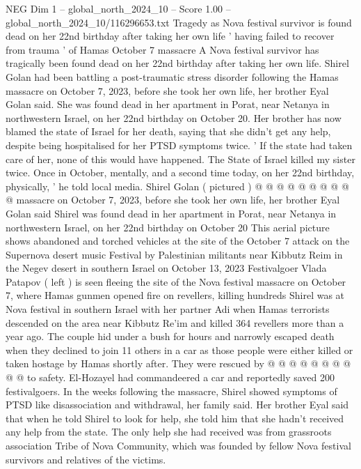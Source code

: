 \begin{textsample}{NEG Dim 1 – global\_north\_2024\_10 – Score 1.00 – global\_north\_2024\_10/116296653.txt}  \label{ex:f1_neg_370}
Tragedy as Nova festival survivor is found dead on her 22nd birthday after taking her own life ' having failed to recover from trauma ' of Hamas October 7 massacre A Nova festival survivor has tragically been found dead on her 22nd birthday after taking her own life.
Shirel Golan had been battling a post-traumatic stress disorder following the Hamas massacre on October 7, 2023, before she took her own life, her brother Eyal Golan said.
She was found dead in her apartment in Porat, near Netanya in northwestern Israel, on her 22nd birthday on October 20.
Her brother has now blamed the state of Israel for her death, saying that she didn't get any help, despite being hospitalised for her PTSD symptoms twice. ' If the state had taken care of her, none of this would have happened.
The State of Israel killed my sister twice.
Once in October, mentally, and a second time today, on her 22nd birthday, physically, ' he told local media.
Shirel Golan ( pictured ) @ @ @ @ @ @ @ @ @ @ massacre on October 7, 2023, before she took her own life, her brother Eyal Golan said Shirel was found dead in her apartment in Porat, near Netanya in northwestern Israel, on her 22nd birthday on October 20 This aerial picture shows abandoned and torched vehicles at the site of the October 7 attack on the Supernova desert music Festival by Palestinian militants near Kibbutz Reim in the Negev desert in southern Israel on October 13, 2023 Festivalgoer Vlada Patapov ( left ) is seen fleeing the site of the Nova festival massacre on October 7, where Hamas gunmen opened fire on revellers, killing hundreds Shirel was at Nova festival in southern Israel with her partner Adi when Hamas terrorists descended on the area near Kibbutz Re'im and killed 364 revellers more than a year ago.
The couple hid under a bush for hours and narrowly escaped death when they declined to join 11 others in a car as those people were either killed or taken hostage by Hamas shortly after.
They were rescued by @ @ @ @ @ @ @ @ @ @ to safety.
El-Hozayel had commandeered a car and reportedly saved 200 festivalgoers.
In the weeks following the massacre, Shirel showed symptoms of PTSD like disassociation and withdrawal, her family said.
Her brother Eyal said that when he told Shirel to look for help, she told him that she hadn't received any help from the state.
The only help she had received was from grassroots association Tribe of Nova Community, which was founded by fellow Nova festival survivors and relatives of the victims.

\end{textsample}
